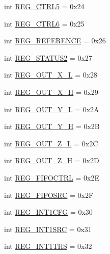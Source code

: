 \begin{DoxyCompactItemize}
int \mbox{\hyperlink{classlis3dh_1_1_l_i_s3_d_h_abbc8c173c41d7cbfc4c941e4703e124d}{R\+E\+G\+\_\+\+C\+T\+R\+L5}} = 0x24
\item 
int \mbox{\hyperlink{classlis3dh_1_1_l_i_s3_d_h_a2ca16740eb23738f87daa1b8143a1286}{R\+E\+G\+\_\+\+C\+T\+R\+L6}} = 0x25
\item 
int \mbox{\hyperlink{classlis3dh_1_1_l_i_s3_d_h_ab86d4631009876be128549e6b8078f85}{R\+E\+G\+\_\+\+R\+E\+F\+E\+R\+E\+N\+CE}} = 0x26
\item 
int \mbox{\hyperlink{classlis3dh_1_1_l_i_s3_d_h_a2603a922445ce6f130f0bc9df7f961b0}{R\+E\+G\+\_\+\+S\+T\+A\+T\+U\+S2}} = 0x27
\item 
int \mbox{\hyperlink{classlis3dh_1_1_l_i_s3_d_h_af42c919037d973217688f95b840b15b6}{R\+E\+G\+\_\+\+O\+U\+T\+\_\+\+X\+\_\+L}} = 0x28
\item 
int \mbox{\hyperlink{classlis3dh_1_1_l_i_s3_d_h_ac4a050b2b93d422b2e87b43a42bbd7b3}{R\+E\+G\+\_\+\+O\+U\+T\+\_\+\+X\+\_\+H}} = 0x29
\item 
int \mbox{\hyperlink{classlis3dh_1_1_l_i_s3_d_h_aff2ee5e386b15abd97fd6b0895cc4add}{R\+E\+G\+\_\+\+O\+U\+T\+\_\+\+Y\+\_\+L}} = 0x2A
\item 
int \mbox{\hyperlink{classlis3dh_1_1_l_i_s3_d_h_a456e3fb2add32fd1f019c2adb58cf192}{R\+E\+G\+\_\+\+O\+U\+T\+\_\+\+Y\+\_\+H}} = 0x2B
\item 
int \mbox{\hyperlink{classlis3dh_1_1_l_i_s3_d_h_a056e4c62b10525bbc01c704c17d3f1df}{R\+E\+G\+\_\+\+O\+U\+T\+\_\+\+Z\+\_\+L}} = 0x2C
\item 
int \mbox{\hyperlink{classlis3dh_1_1_l_i_s3_d_h_a676ff688bc5d1ada1737009ceea8afe9}{R\+E\+G\+\_\+\+O\+U\+T\+\_\+\+Z\+\_\+H}} = 0x2D
\item 
int \mbox{\hyperlink{classlis3dh_1_1_l_i_s3_d_h_a8872526d156310b7af08dd4726b87984}{R\+E\+G\+\_\+\+F\+I\+F\+O\+C\+T\+RL}} = 0x2E
\item 
int \mbox{\hyperlink{classlis3dh_1_1_l_i_s3_d_h_a67a66204496701aad41abf6c59b11aaa}{R\+E\+G\+\_\+\+F\+I\+F\+O\+S\+RC}} = 0x2F
\item 
int \mbox{\hyperlink{classlis3dh_1_1_l_i_s3_d_h_a35904d7931df8888ad0d49c27386b929}{R\+E\+G\+\_\+\+I\+N\+T1\+C\+FG}} = 0x30
\item 
int \mbox{\hyperlink{classlis3dh_1_1_l_i_s3_d_h_aa8aef8b59aa2fa89ad549460de6ad2d8}{R\+E\+G\+\_\+\+I\+N\+T1\+S\+RC}} = 0x31
\item 
int \mbox{\hyperlink{classlis3dh_1_1_l_i_s3_d_h_a7535462708e5204c20fd4671d6c837f0}{R\+E\+G\+\_\+\+I\+N\+T1\+T\+HS}} = 0x32
\item 

\end{DoxyCompactItemize}
